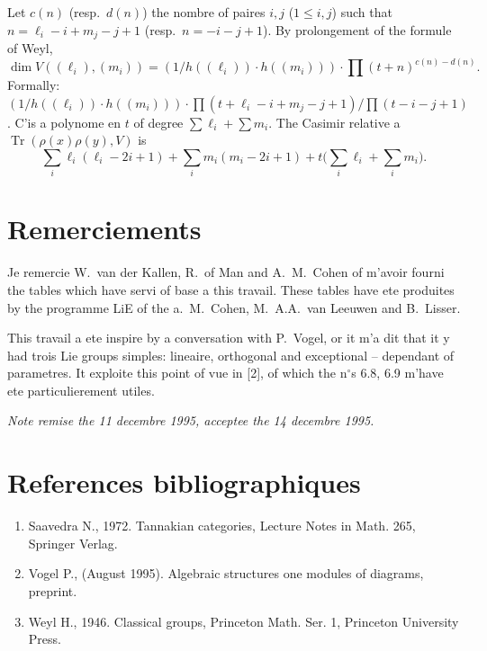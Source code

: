 \documentclass[11pt,a4paper]{article}
\DeclareMathOperator{\Tr}{Tr}
\begin{document}
Let $c(n)$ (resp.~$d(n)$) the nombre of paires $i, j$ ($1 \leq i, j$) such that $n = \ell_i - i + m_j - j + 1$ (resp.~$n = -i - j + 1$). By prolongement of the formule of Weyl,
$$
\dim V((\ell_i), (m_i)) = (1/h((\ell_i)) \cdot h((m_i))) \cdot \prod (t + n)^{c(n) - d(n)}.
$$
Formally: $(1/h((\ell_i)) \cdot h((m_i))) \cdot \prod (t + \ell_i - i + m_j - j + 1) / \prod (t - i - j + 1)$. C'is a polynome en $t$ of degree $\sum \ell_i + \sum m_i$. The Casimir relative a $\Tr(\rho(x)\rho(y), V)$ is
$$
\sum_i \ell_i(\ell_i - 2i + 1) + \sum_i m_i(m_i - 2i + 1) + t\bigl(\sum_i \ell_i + \sum_i m_i\bigr).
$$

\section*{Remerciements}

Je remercie W.~van der Kallen, R.~of Man and A.~M.~Cohen of m'avoir fourni the tables which have servi of base a this travail. These tables have ete produites by the programme LiE of the a.~M.~Cohen, M.~A.A.~van Leeuwen and B.~Lisser.

This travail a ete inspire by a conversation with P.~Vogel, or it m'a dit that it y had trois Lie groups simples: lineaire, orthogonal and exceptional -- dependant of parametres. It exploite this point of vue in [2], of which the n$^\circ$s 6.8, 6.9 m'have ete particulierement utiles.

\smallskip
\noindent\textit{Note remise the 11 decembre 1995, acceptee the 14 decembre 1995.}

\section*{References bibliographiques}

\begin{enumerate}
\item[{[1]}] Saavedra N., 1972. Tannakian categories, Lecture Notes in Math. 265, Springer Verlag.

\item[{[2]}] Vogel P., (August 1995). Algebraic structures one modules of diagrams, preprint.

\item[{[3]}] Weyl H., 1946. Classical groups, Princeton Math. Ser. 1, Princeton University Press.
\end{enumerate}
\end{document}
